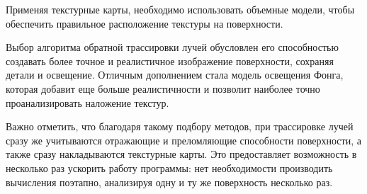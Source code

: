 Применяя текстурные карты, необходимо использовать объемные модели, чтобы обеспечить правильное расположение текстуры на поверхности.

Выбор алгоритма обратной трассировки лучей обусловлен его способностью создавать более точное и реалистичное изображение поверхности, сохраняя детали и освещение. Отличным дополнением стала модель освещения Фонга, которая добавит еще больше реалистичности и позволит наиболее точно проанализировать наложение текстур.

Важно отметить, что благодаря такому подбору методов, при трассировке лучей сразу же учитываются отражающие и преломляющие способности поверхности, а также сразу накладываются текстурные карты. Это предоставляет возможность в несколько раз ускорить работу программы: нет необходимости производить вычисления поэтапно, анализируя одну и ту же поверхность несколько раз.
